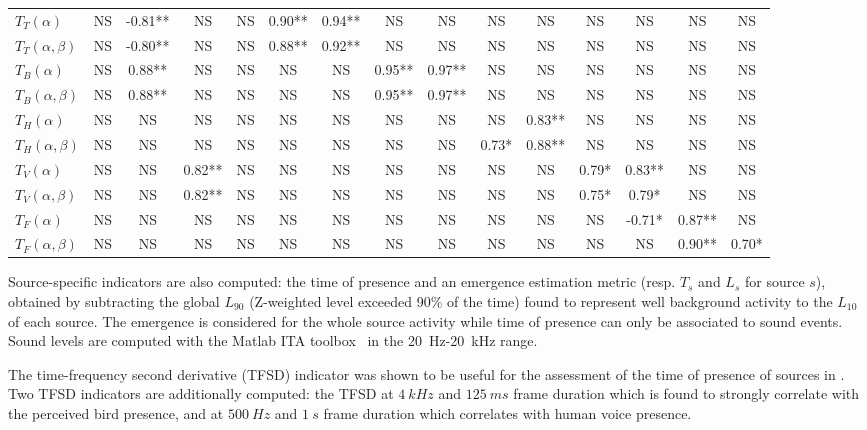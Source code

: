 \documentclass{article}
\begin{document}
\begin{sloppy}
\begin{table}[ht!]
{\begin{tabular}{ l | c c c c c c c c c c c c c c }
	$T_T(\alpha)$ & NS & -0.81** & NS & NS & 0.90** & 0.94** & NS & NS & NS & NS & NS & NS & NS & NS \\
	$T_T(\alpha, \beta)$ & NS & -0.80** & NS & NS & 0.88** & 0.92** & NS & NS & NS & NS & NS & NS & NS & NS \\ \hline
	$T_B(\alpha)$ & NS & 0.88** & NS & NS & NS & NS & 0.95** & 0.97** & NS & NS & NS & NS & NS & NS \\
	$T_B(\alpha, \beta)$ & NS & 0.88** & NS & NS & NS & NS & 0.95** & 0.97** & NS & NS & NS & NS & NS & NS \\ \hline
	$T_H(\alpha)$ & NS & NS & NS & NS & NS & NS & NS & NS & NS & 0.83** & NS & NS & NS & NS \\
	$T_H(\alpha, \beta)$ & NS & NS & NS & NS & NS & NS & NS & NS & 0.73* & 0.88** & NS & NS & NS & NS \\ \hline
	$T_V(\alpha)$ & NS & NS & 0.82** & NS & NS & NS & NS & NS & NS & NS & 0.79* & 0.83** & NS & NS \\
	$T_V(\alpha, \beta)$ & NS & NS & 0.82** & NS & NS & NS & NS & NS & NS & NS & 0.75* & 0.79* & NS & NS \\ \hline
	$T_F(\alpha)$ & NS & NS & NS & NS & NS & NS & NS & NS & NS & NS & NS & -0.71* & 0.87** & NS \\
	$T_F(\alpha, \beta)$ & NS & NS & NS & NS & NS & NS & NS & NS & NS & NS & NS & NS & 0.90** & 0.70* \\ \hline
\end{tabular}
}
\end{table}

Source-specific indicators are also computed: the time of presence and an emergence estimation metric (resp. $T_s$ and $L_s$ for source $s$), obtained by subtracting the global $L_{90}$ (Z-weighted level exceeded 90\% of the time) found to represent well background activity to the $L_{10}$ of each source. The emergence is considered for the whole source activity while time of presence can only be associated to sound events. Sound levels are computed with the Matlab ITA toolbox~\cite{itatoolbox2017} in the 20~Hz-20~kHz range.

The time-frequency second derivative (TFSD) indicator was shown to be useful for the assessment of the time of presence of sources in \cite{aumond2017}. Two TFSD indicators are additionally computed: the TFSD at $4~kHz$ and $125~ms$ frame duration which is found to strongly correlate with the perceived bird presence, and at $500~Hz$ and $1~s$ frame duration which correlates with human voice presence.


\end{sloppy}
\end{document}
